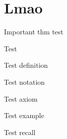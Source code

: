 \documentclass{article}
\begin{document}
\section{Lmao}

\begin{importantthm}
    Important thm test
\end{importantthm}
\begin{trivialproof}
    Test
\end{trivialproof}

\begin{definition}
    Test definition
\end{definition}
\begin{notation}
    Test notation
\end{notation}
\begin{axiom}
    Test axiom
\end{axiom}
\begin{example}
    Test example
\end{example}
\begin{recall}
    Test recall
\end{recall}
\end{document}
